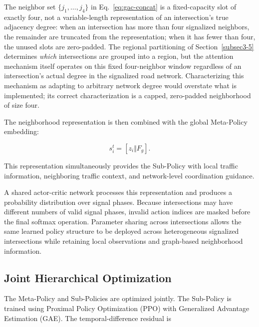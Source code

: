 \documentclass[3p,times]{elsarticle}
\theoremstyle{plain}
\theoremstyle{definition}
\begin{document}
The neighbor set $\{j_1,\ldots,j_4\}$ in Eq.~\eqref{eq:gac-concat} is a
fixed-capacity slot of exactly four, not a variable-length
representation of an intersection's true adjacency degree: when an
intersection has more than four signalized neighbors, the remainder are
truncated from the representation; when it has fewer than four, the
unused slots are zero-padded. The regional partitioning of
Section~\ref{subsec3-5} determines \emph{which} intersections are
grouped into a region, but the attention mechanism itself operates on
this fixed four-neighbor window regardless of an intersection's actual
degree in the signalized road network. Characterizing this mechanism as
adapting to arbitrary network degree would overstate what is
implemented; its correct characterization is a capped, zero-padded
neighborhood of size four.

The neighborhood representation is then combined with the global
Meta-Policy embedding:

\begin{equation}
s_i^t = \left[z_i \Vert F_g\right].
\end{equation}

This representation simultaneously provides the Sub-Policy with
local traffic information, neighboring traffic context, and
network-level coordination guidance.

A shared actor-critic network processes this representation and
produces a probability distribution over signal phases. Because
intersections may have different numbers of valid signal phases,
invalid action indices are masked before the final softmax operation.
Parameter sharing across intersections allows the same learned policy
structure to be deployed across heterogeneous signalized intersections
while retaining local observations and graph-based neighborhood
information.


\subsection{Joint Hierarchical Optimization}\label{subsec3-8}

The Meta-Policy and Sub-Policies are optimized jointly. The Sub-Policy
is trained using Proximal Policy Optimization (PPO) with Generalized
Advantage Estimation (GAE). The temporal-difference residual is
\end{document}
